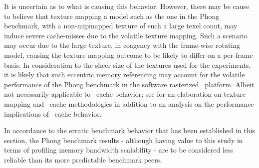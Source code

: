 It is uncertain as to what is causing this behavior.
However, there may be cause to believe that texture mapping a model such as the one in the Phong benchmark, with a non-mipmapped texture of such a large texel count, may induce severe cache-misses due to the volatile texture mapping.
Such a scenario may occur due to the large texture, in coagency with the frame-wise rotating model, causing the texture mapping outcome to be likely to differ on a per-frame basis.
In consideration to the sheer size of the textures used for the experiments, it is likely that such eccentric memory referencing may account for the volatile performance of the Phong benchmark in the software rasterized \dvttermsimics\ platform.
Albeit not necessarily applicable to \dvttermcpu\ cache behavior; see  for an elaboration on texture mapping and \dvttermgpu\ cache methodologies in addition to an analysis on the performance implications of \dvttermgpu\ cache behavior.

In accordance to the erratic benchmark behavior that has been established in this section, the Phong benchmark results - although having value to this study in terms of profiling memory bandwidth scalability - are to be considered less reliable than its more predictable benchmark peers.


